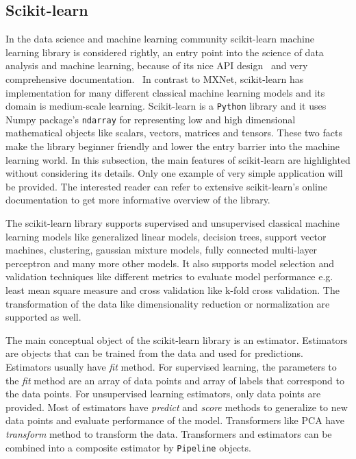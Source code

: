 \documentclass[english, 12pt, a4paper, elec, utf8, online]{aaltothesis}
\begin{document}
\subsection{Scikit-learn}
In the data science and machine learning community scikit-learn machine learning library is considered rightly, an entry point into the science of data analysis and machine learning, because of its nice API design~\cite{buitinck2013api} and very comprehensive documentation.~\cite{pedregosa2011scikit} In contrast to MXNet, scikit-learn has implementation for many different classical machine learning models and its domain is medium-scale learning. Scikit-learn is a \texttt{Python} library and it uses Numpy package's \texttt{ndarray} for representing low and high dimensional mathematical objects like scalars, vectors, matrices and tensors. These two facts make the library beginner friendly and lower the entry barrier into the machine learning world. 
In this subsection, the main features of scikit-learn are highlighted without considering its details. 
Only one example of very simple application will be provided. The interested reader can refer to extensive scikit-learn's online documentation to get more informative overview of the library.

The scikit-learn library supports supervised and unsupervised classical machine learning models like generalized linear models, decision trees, support vector machines, clustering, gaussian mixture models, fully connected multi-layer perceptron and many more other models. It also supports model selection and validation techniques like different metrics to evaluate model performance e.g. least mean square measure and cross validation like k-fold cross validation. The transformation of the data like dimensionality reduction or normalization are supported as well.

The main conceptual object of the scikit-learn library is an estimator. Estimators are objects that can be trained from the data and used for predictions. Estimators usually have \textit{fit} method. For supervised learning, the parameters to the \textit{fit} method are an array of data points and array of labels that correspond to the data points. For unsupervised learning estimators, only data points are provided. Most of estimators have \textit{predict} and \textit{score} methods to generalize to new data points and evaluate performance of the model. Transformers like PCA have \textit{transform} method to transform the data. Transformers and estimators can be combined into a composite estimator by \texttt{Pipeline} objects.
\end{document}
